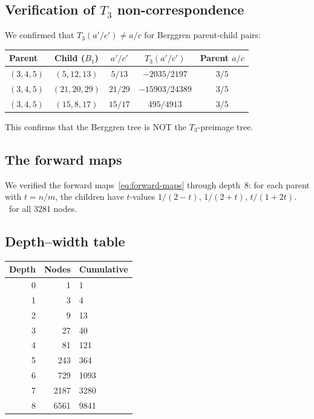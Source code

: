 \documentclass[12pt]{amsart}
\theoremstyle{definition}
\theoremstyle{remark}
\begin{document}
\subsection{Verification of $T_3$ non-correspondence}

We confirmed that $T_3(a'/c') \ne a/c$ for Berggren parent-child pairs:
\begin{center}
\begin{tabular}{lcccc}
  \toprule
  Parent & Child ($B_1$) & $a'/c'$ & $T_3(a'/c')$ & Parent $a/c$ \\
  \midrule
  $(3,4,5)$ & $(5,12,13)$ & $5/13$ & $-2035/2197$ & $3/5$ \\
  $(3,4,5)$ & $(21,20,29)$ & $21/29$ & $-15903/24389$ & $3/5$ \\
  $(3,4,5)$ & $(15,8,17)$ & $15/17$ & $495/4913$ & $3/5$ \\
  \bottomrule
\end{tabular}
\end{center}
This confirms that the Berggren tree is NOT the $T_3$-preimage tree.

\subsection{The forward maps}

We verified the forward maps~\eqref{eq:forward-maps} through depth~8:
for each parent with $t=n/m$, the children have $t$-values
$1/(2-t)$, $1/(2+t)$, $t/(1+2t)$.  \checkmark\ for all 3281 nodes.

\subsection{Depth--width table}

\begin{center}
\begin{tabular}{rrl}
  \toprule
  Depth & Nodes & Cumulative \\
  \midrule
  0 & 1 & 1 \\
  1 & 3 & 4 \\
  2 & 9 & 13 \\
  3 & 27 & 40 \\
  4 & 81 & 121 \\
  5 & 243 & 364 \\
  6 & 729 & 1093 \\
  7 & 2187 & 3280 \\
  8 & 6561 & 9841 \\
  \bottomrule
\end{tabular}
\end{center}
\end{document}
